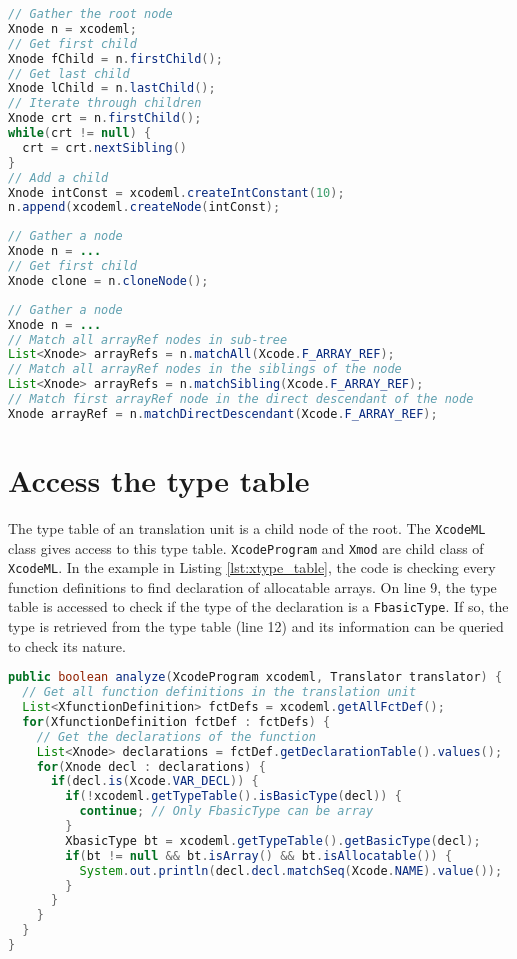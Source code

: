 \begin{lstlisting}[label=lst:xnode_node, language=Java, caption=XtypeTable]
// Gather the root node
Xnode n = xcodeml;
// Get first child
Xnode fChild = n.firstChild();
// Get last child
Xnode lChild = n.lastChild();
// Iterate through children
Xnode crt = n.firstChild();
while(crt != null) {
  crt = crt.nextSibling()
}
// Add a child
Xnode intConst = xcodeml.createIntConstant(10);
n.append(xcodeml.createNode(intConst);
\end{lstlisting}

\begin{lstlisting}[label=lst:xnode_clone, language=Java, caption=XtypeTable]
// Gather a node
Xnode n = ...
// Get first child
Xnode clone = n.cloneNode();
\end{lstlisting}

\begin{lstlisting}[label=lst:xnode_match, language=Java, caption=XtypeTable]
// Gather a node
Xnode n = ...
// Match all arrayRef nodes in sub-tree
List<Xnode> arrayRefs = n.matchAll(Xcode.F_ARRAY_REF);
// Match all arrayRef nodes in the siblings of the node
List<Xnode> arrayRefs = n.matchSibling(Xcode.F_ARRAY_REF);
// Match first arrayRef node in the direct descendant of the node
Xnode arrayRef = n.matchDirectDescendant(Xcode.F_ARRAY_REF);
\end{lstlisting}

\section{Access the type table}
The type table of an \xcodemlf translation unit is a child node of the root. 
The \lstinline|XcodeML| class gives access to this type table. 
\lstinline|XcodeProgram| and \lstinline|Xmod| are child class of 
\lstinline|XcodeML|. 
In the example in Listing \ref{lst:xtype_table}, the code is checking
every function definitions to find declaration of allocatable arrays.
On line 9, the type table is accessed to check if the type of the 
declaration is a \lstinline|FbasicType|. If so, the type is retrieved from
the type table (line 12) and its information can be queried to check its
nature.

\begin{lstlisting}[label=lst:xtype_table, language=Java, caption=XtypeTable]
public boolean analyze(XcodeProgram xcodeml, Translator translator) {
  // Get all function definitions in the translation unit
  List<XfunctionDefinition> fctDefs = xcodeml.getAllFctDef();
  for(XfunctionDefinition fctDef : fctDefs) {
    // Get the declarations of the function
    List<Xnode> declarations = fctDef.getDeclarationTable().values();
    for(Xnode decl : declarations) {
      if(decl.is(Xcode.VAR_DECL)) {
        if(!xcodeml.getTypeTable().isBasicType(decl)) {
          continue; // Only FbasicType can be array
        }
        XbasicType bt = xcodeml.getTypeTable().getBasicType(decl);
        if(bt != null && bt.isArray() && bt.isAllocatable()) {
          System.out.println(decl.decl.matchSeq(Xcode.NAME).value());
        }
      }
    }
  }
}
\end{lstlisting}




